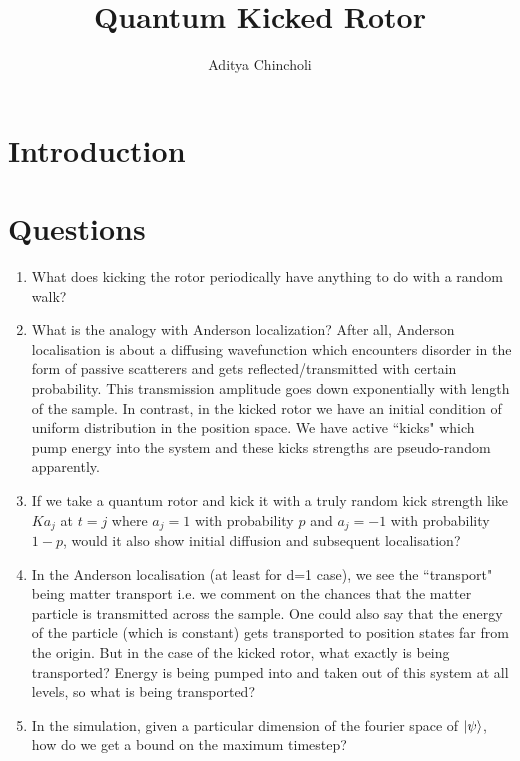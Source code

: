 \documentclass[12pt]{article}
\title{Quantum Kicked Rotor}
\author{Aditya Chincholi}
\begin{document}
\maketitle

\section{Introduction}

\section{Questions}
\begin{enumerate}
    \item What does kicking the rotor periodically have anything to do with a random walk?
    
    \item What is the analogy with Anderson localization? After all, Anderson localisation
    is about a diffusing wavefunction which encounters disorder in the form of passive scatterers
    and gets reflected/transmitted with certain probability. This transmission amplitude goes down
    exponentially with length of the sample. In contrast, in the kicked rotor we have an initial
    condition of uniform distribution in the position space. We have active ``kicks" which pump
    energy into the system and these kicks strengths are pseudo-random apparently.
    
    \item \label{ques:trulyrandom} If we take a quantum rotor and kick it with a truly random kick strength like $Ka_j$ at $t = j$
    where $a_j = 1$ with probability $p$ and $a_j = -1$ with probability $1-p$, would it also show initial
    diffusion and subsequent localisation?
    
    \item In the Anderson localisation (at least for d=1 case), we see the ``transport" being matter
    transport i.e. we comment on the chances that the matter particle is transmitted across the sample.
    One could also say that the energy of the particle (which is constant) gets transported to position
    states far from the origin. But in the case of the kicked rotor, what exactly is being transported?
    Energy is being pumped into and taken out of this system at all levels, so what is being transported?
    
    \item \label{ques:timestepsbound} In the simulation, given a particular dimension of the fourier space
    of $\ket{\psi}$, how do we get a bound on the maximum timestep?
    
\end{enumerate}
\end{document}
